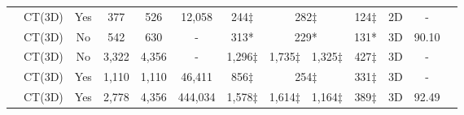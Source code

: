 \documentclass[letterpaper]{article}
\begin{document}
\begin{table}[!ht]
{\begin{tabular}{|c|c|c|c|c|c|c|c|c|c|c|c|c|}
 \cite{covid-ctset} & CT(3D) & Yes & 377 & 526 & 12,058 & 244$\ddagger$ & \multicolumn{2}{c|}{282$\ddagger$} & {124$\ddagger$} & 2D & - \\\cline{8-9}
 \cite{Zheng2020} & CT(3D) & No & 542 & 630 & - & 313* & \multicolumn{2}{c|}{229*} & {131*} & 3D & 90.10 \\\cline{8-9}
 \cite{li2020artificial} & CT(3D) & No & 3,322 & 4,356 & - & 1,296$\ddagger$ & 1,735$\ddagger$& 1,325$\ddagger$ & 427$\ddagger$ & 3D & - \\\cline{8-9}
 \cite{mosmeddata} & CT(3D) & Yes & 1,110 & 1,110 & 46,411 & 856$\ddagger$ & \multicolumn{2}{c|}{254$\ddagger$} & {331$\ddagger$} & 3D & - \\\cline{8-9}


 \cite{cell_covid} & CT(3D) & Yes & 2,778 & 4,356 & 444,034 & 1,578$\ddagger$ & 1,614$\ddagger$ & 1,164$\ddagger$ & 389$\ddagger$ & 3D & 92.49\\\hline
\end{tabular}
}
\label{table:dataset_review}
\end{table}
\end{document}
